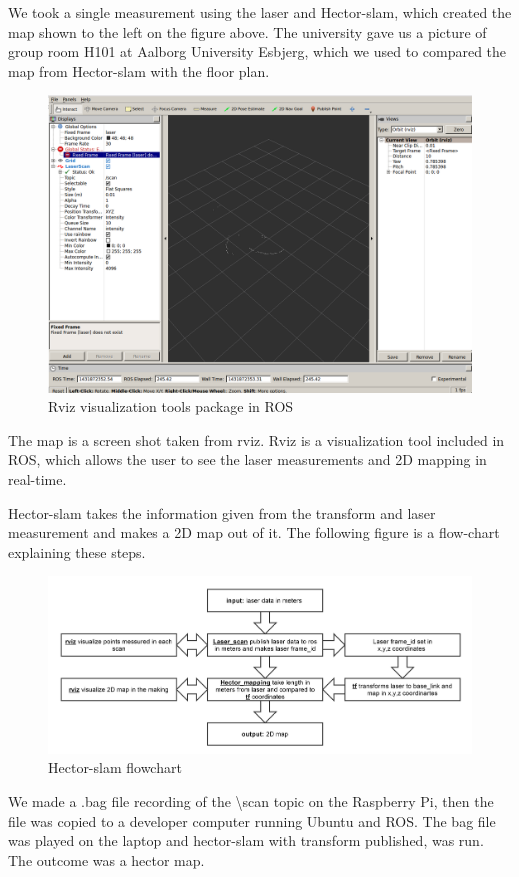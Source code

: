 We took a single measurement using the laser and Hector-slam, which created the map shown to the left on the figure above. The university gave us a picture of group room H101 at Aalborg University Esbjerg, which we used to compared the map from Hector-slam with the floor plan. 

\begin{figure}[H]
	\centering
	\includegraphics[width=.5\linewidth]{images/rviz.png}
	\caption{Rviz visualization tools package in ROS}
	\label{rviz}
\end{figure}

The map is a screen shot taken from rviz. Rviz is a visualization tool included in ROS, which allows the user to see the laser measurements and 2D mapping in real-time.\cite{rviz}

Hector-slam takes the information given from the transform and laser measurement and makes a 2D map out of it. The following figure is a flow-chart explaining these steps.

\begin{figure}[H]
	\centering
	\includegraphics[width=1\linewidth]{images/hector_flow.png}
	\caption{Hector-slam flowchart}
	\label{fig:rosflow}
\end{figure}

We made a .bag file recording of the \textbackslash scan topic on the Raspberry Pi, then the file was copied to a developer computer running Ubuntu and ROS. The bag file was played on the laptop and hector-slam with transform published, was run. The outcome was a hector map.

 

